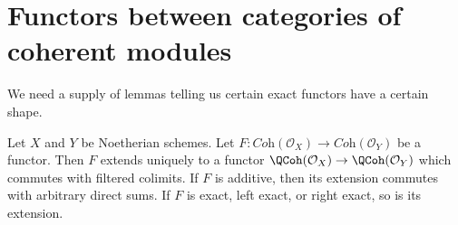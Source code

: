\section{Functors between categories of coherent modules}
\label{section-functor-coherent}


\noindent
We need a supply of lemmas telling us certain exact functors have
a certain shape.

\begin{lemma}
\label{lemma-functor-coherent}
Let $X$ and $Y$ be Noetherian schemes. Let
$F : \textit{Coh}(\mathcal{O}_X) \to \textit{Coh}(\mathcal{O}_Y)$
be a functor. Then $F$ extends uniquely to a functor
$\QCoh(\mathcal{O}_X) \to \QCoh(\mathcal{O}_Y)$
which commutes with filtered colimits.
If $F$ is additive, then its extension commutes with arbitrary direct sums.
If $F$ is exact, left exact, or right exact, so is its extension.
\end{lemma}


